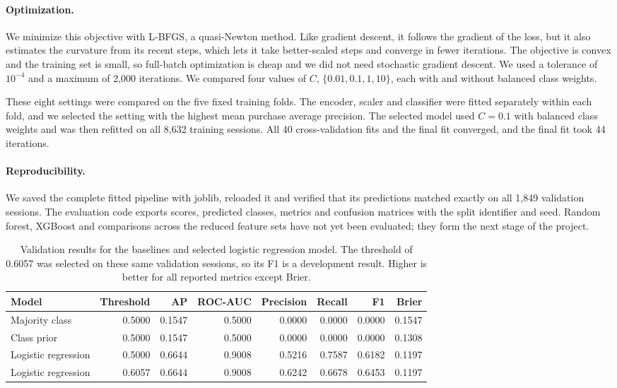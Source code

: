 \documentclass[11pt]{article}
\begin{document}
\paragraph{Optimization.} We minimize this objective with L-BFGS, a
quasi-Newton method. Like gradient descent, it follows the gradient of the
loss, but it also estimates the curvature from its recent steps, which lets
it take better-scaled steps and converge in fewer iterations. The objective
is convex and the training set is small, so full-batch optimization is cheap
and we did not need stochastic gradient descent. We used a tolerance of
$10^{-4}$ and a maximum of 2,000 iterations. We compared four values of $C$,
$\{0.01, 0.1, 1, 10\}$, each with and without balanced class weights.

These eight settings were compared on the five fixed training folds. The
encoder, scaler and classifier were fitted separately within each fold, and
we selected the setting with the highest mean purchase average precision.
The selected model used $C=0.1$ with balanced class weights and was then
refitted on all 8,632 training sessions. All 40 cross-validation fits and the
final fit converged, and the final fit took 44 iterations.

\paragraph{Reproducibility.} We saved the complete fitted pipeline with
joblib, reloaded it and verified that its predictions matched exactly on all
1,849 validation sessions. The evaluation code exports scores, predicted
classes, metrics and confusion matrices with the split identifier and seed.
Random forest, XGBoost and comparisons across the reduced feature sets have
not yet been evaluated; they form the next stage of the project.

\begin{table}[t]
  \centering
  \small
  \begin{tabular}{lrrrrrrr}
    \hline
    \textbf{Model} & \textbf{Threshold} & \textbf{AP} & \textbf{ROC-AUC} & \textbf{Precision} & \textbf{Recall} & \textbf{F1} & \textbf{Brier} \\
    \hline
    Majority class & 0.5000 & 0.1547 & 0.5000 & 0.0000 & 0.0000 & 0.0000 & 0.1547 \\
    Class prior & 0.5000 & 0.1547 & 0.5000 & 0.0000 & 0.0000 & 0.0000 & 0.1308 \\
    Logistic regression & 0.5000 & 0.6644 & 0.9008 & 0.5216 & 0.7587 & 0.6182 & 0.1197 \\
    Logistic regression & 0.6057 & 0.6644 & 0.9008 & 0.6242 & 0.6678 & 0.6453 & 0.1197 \\
    \hline
  \end{tabular}
  \caption{\label{tab:validation}
    Validation results for the baselines and selected logistic regression
    model. The threshold of 0.6057 was selected on these same validation
    sessions, so its F1 is a development result. Higher is better for all
    reported metrics except Brier.}
\end{table}
\end{document}
